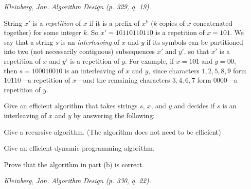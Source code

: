 \documentclass[solutionbox,answers]{exam}
\begin{document}
\begin{questions}
\begin{parts}
\begin{solutionbox}{}
  \end{solutionbox}
  \end{parts}
\newpage



\question \textit{Kleinberg, Jon. Algorithm Design (p. 329, q. 19).} 

String $x'$ is a \emph{repetition} of $x$ if it is a prefix of $x^k$ ($k$ copies of $x$ concatenated
together) for some integer $k$. So $x' = 10110110110$ is a repetition of $x = 101$.
We say that a string $s$ is an \textit{interleaving} of $x$ and $y$ if its symbols can be partitioned into two (not necessarily contiguous) subsequences $x'$ and $y'$, so that $x'$ is a repetition of $x$ and $y'$ is a repetition of $y$. 
For example, if $x = 101$ and $y = 00$,
then $s = 100010010$ is an interleaving of $x$ and $y$, since characters $1,2,5,8,9$ form $10110$—a repetition of $x$—and the remaining characters $3,4,6,7$ form
$0000$—a repetition of $y$.

Give an efficient algorithm that takes strings $s$, $x$, and $y$ and decides if $s$ is an interleaving of $x$ and $y$ by answering the following:

\begin{parts}
  \item Give a recursive algorithm. (The algorithm does not need to be efficient)
  \begin{solutionbox}{} \vspace{1em} 
  
  \end{solutionbox}
  
  \item Give an efficient dynamic programming algorithm.
  \begin{solutionbox}{} \vspace{1em} 
  
  \end{solutionbox}
  
  \item Prove that the algorithm in part (b) is correct.
  \begin{solutionbox}{} \vspace{1em} 
  
  \end{solutionbox}
  \end{parts}

\newpage


\question \textit{Kleinberg, Jon. Algorithm Design (p. 330, q. 22).} 


\end{questions}
\end{document}
